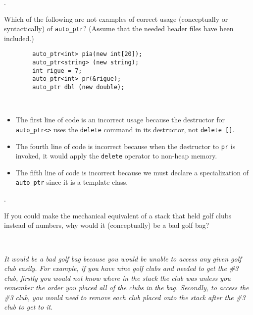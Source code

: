 \documentclass{amsart}
\begin{document}
. 
\begin{minipage}[t]{11.5 cm}
	Which of the following are not examples of correct usage (conceptually or syntactically) of \verb+auto_ptr+? (Assume that the needed header files have been included.)
	\begin{verbatim}
		auto_ptr<int> pia(new int[20]);
		auto_ptr<string> (new string);
		int rigue = 7;
		auto_ptr<int> pr(&rigue);
		auto_ptr dbl (new double);
	\end{verbatim}
\end{minipage} \\[1ex]
\phantom{2. } 
\begin{minipage}[t]{11.5 cm}
	{\slshape 
		\begin{itemize}
			\item
				The first line of code is an incorrect usage because
				the destructor for \verb+auto_ptr<>+ uses the \verb+delete+
				command in its destructor, not \verb+delete []+.
			\item
				The fourth line of code is incorrect because when the destructor
				to \verb+pr+ is invoked, it would apply the \verb+delete+ operator
				to non-heap memory.
			\item
				The fifth line of code is incorrect because we must declare
				a specialization of \verb+auto_ptr+ since it is a template class.
		\end{itemize}
	} 
\end{minipage} 
\vfill 
\newpage

\phantom{\quad}\vfill
{}. 
\begin{minipage}[t]{11.5 cm}
	If you could make the mechanical equivalent of a stack that held golf clubs instead of numbers, why would it (conceptually) be a bad golf bag?
\end{minipage} \\[1ex]
\phantom{3. } 
\begin{minipage}[t]{11.5 cm}
	{\slshape 
		It would be a bad golf bag because you would be unable to access
		any given golf club easily. 
		For example, if you have nine golf clubs and needed to get 
		the \#3 club, firstly you would not know where in the stack
		the club was unless you remember the order you placed all
		of the clubs in the bag.
		Secondly, to access the \#3 club, you would need to remove
		each club placed onto the stack after the \#3 club to get to it.
	} 
\end{minipage} 
\vfill
\end{document}
